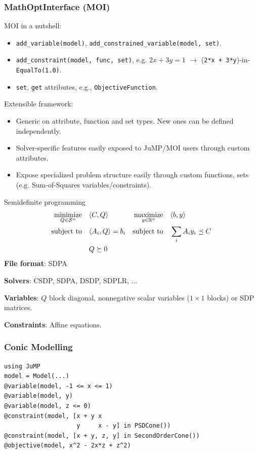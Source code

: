\documentclass{beamer}
\begin{document}
  \begin{frame}[fragile]
    \frametitle{MathOptInterface (MOI)}
    MOI in a nutshell:
    \begin{itemize}
      \item \verb|add_variable(model)|, \verb|add_constrained_variable(model, set)|.
      \item \verb|add_constraint(model, func, set)|, e.g. $2x + 3y = 1$ $\to$ (\verb|2*x + 3*y|)-in-\verb|EqualTo(1.0)|.
      \item \verb|set|, \verb|get| attributes, e.g., \verb|ObjectiveFunction|.
    \end{itemize}
    Extensible framework:
    \begin{itemize}
      \item \alert{Generic} on attribute, function and set types. New ones can be defined \alert{independently}.
      \item Solver-\alert{specific} features easily exposed to JuMP/MOI users through \alert{custom} attributes.
      \item Expose \alert{specialized} problem structure easily through \alert{custom} functions, sets (e.g. Sum-of-Squares variables/constraints).
    \end{itemize}
  \end{frame}

  \begin{frame}{Semidefinite programming}
    \begin{align*}
      \operatorname*{minimize}_{Q \in \mathcal{S}^n} \quad & \langle C, Q \rangle & \operatorname*{maximize}_{y \in \mathbb{R}^n} \quad & \langle b, y \rangle\\
      \operatorname*{\operatorname*{\text{subject to}}\quad} & \langle A_i, Q \rangle = b_i & \operatorname*{\operatorname*{\text{subject to}}\quad} & \sum_i A_i y_i \preceq C\\
        & Q \succeq 0
    \end{align*}
    \textbf{File format}: SDPA

    \textbf{Solvers}: CSDP, SDPA, DSDP, SDPLR, ...

    \textbf{Variables}: $Q$ block diagonal, nonnegative scalar variables ($1 \times 1$ blocks) or SDP matrices.

    \textbf{Constraints}: Affine equations.
  \end{frame}

  \begin{frame}[fragile]
    \frametitle{Conic Modelling}
\begin{verbatim}
using JuMP
model = Model(...)
@variable(model, -1 <= x <= 1)
@variable(model, y)
@variable(model, z <= 0)
@constraint(model, [x + y x
                    y     x - y] in PSDCone())
@constraint(model, [x + y, z, y] in SecondOrderCone())
@objective(model, x^2 - 2x*z + z^2)
\end{verbatim}
  \end{frame}
\end{document}
